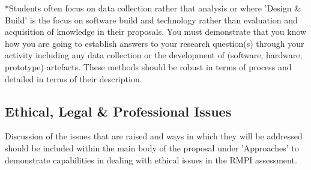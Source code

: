 *Students often focus on data collection rather that analysis or where 'Design \& Build' is the focus on software build and technology rather than evaluation and acquisition of knowledge in their proposals. You must demonstrate that you know how you are going to establish answers to your research question(s) through your activity including any data collection or the development of (software, hardware, prototype) artefacts. These methods should be robust in terms of process and detailed in terms of their description.

\subsection{Ethical, Legal \& Professional Issues}

Discussion of the issues that are raised and ways in which they will be addressed should be included within the main body of the proposal under 'Approaches' to demonstrate capabilities in dealing with ethical issues in the RMPI assessment. 